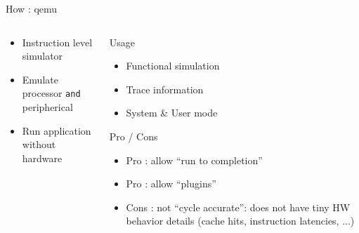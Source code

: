 %
\begin{Frame}{How : qemu}
  \begin{columns}[t]
    \begin{column}{\BW} %
      \begin{block}{ \hfill {}}
        \begin{itemize}
        \item Instruction level simulator
        \item Emulate processor \texttt{and} peripherical
        \item Run application without hardware
        \end{itemize}
      \end{block} 
    \end{column}
    
    \begin{column}{\BW} %
      \begin{block}{Usage}
        \begin{itemize}
        \item Functional simulation
        \item Trace information
        \item System \& User mode
        \end{itemize}
      \end{block}   
      \begin{alertblock}{Pro / Cons}
        \begin{itemize}
        \item Pro : allow ``run to completion''
        \item Pro : allow ``plugins''
        \item Cons : not ``cycle accurate'':  does not have tiny HW
          behavior details (cache hits, instruction latencies, ...)
        \end{itemize}
        
      \end{alertblock}
    \end{column}
  \end{columns}  
\end{Frame}


